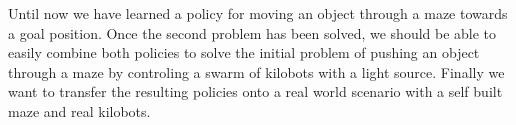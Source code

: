 \documentclass[twoside]{article}
\begin{document}
Until now we have learned a policy for moving an object through a maze towards a
goal position. Once the second problem has been solved, we should be able to
easily combine both policies to solve the initial problem of pushing an object
through a maze by controling a swarm of kilobots with a light source. Finally we
want to transfer the resulting policies onto a real world scenario with a self
built maze and real kilobots.

 
\end{document}

